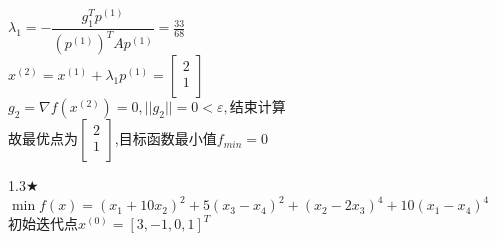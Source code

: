 \begin{solution}
    $\lambda_1=-\dfrac{g_1^Tp^{(1)}}{(p^{(1)})^TAp^{(1)}}=\frac{33}{68}$\\
    $x^{(2)}=x^{(1)}+\lambda_1p^{(1)}=\begin{bmatrix} 2\\1\\\end{bmatrix}$\\
    $g_2=\nabla f(x^{(2)})=0,||g_2||=0<\varepsilon,\text{结束计算}$\\
    故最优点为$\begin{bmatrix} 2\\1\\\end{bmatrix}$,目标函数最小值$f_{min}=0$
\end{solution}

\begin{problem}{1.3$\bigstar$}
    $\min f(x)=(x_1+10x_2)^2+5(x_3-x_4)^2+(x_2-2x_3)^4+10(x_1-x_4)^4$\\
    初始迭代点${x^{(0)}}=[3,-1,0,1]^T$
\end{problem}
